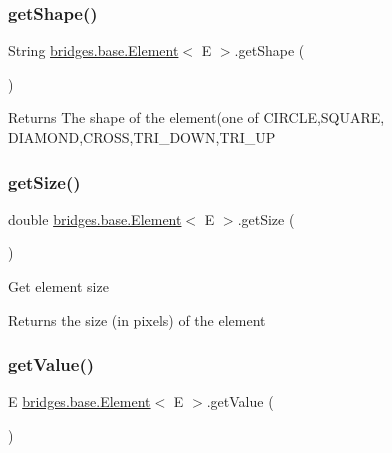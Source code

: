 \subsubsection{\texorpdfstring{getShape()}{getShape()}}
{\footnotesize\ttfamily String \mbox{\hyperlink{classbridges_1_1base_1_1_element}{bridges.\+base.\+Element}}$<$ E $>$.get\+Shape (\begin{DoxyParamCaption}{ }\end{DoxyParamCaption})}

\begin{DoxyReturn}{Returns}
The shape of the element(one of C\+I\+R\+C\+LE,S\+Q\+U\+A\+RE, D\+I\+A\+M\+O\+ND,C\+R\+O\+SS,T\+R\+I\+\_\+\+D\+O\+WN,T\+R\+I\+\_\+\+UP 
\end{DoxyReturn}
\mbox{\label{classbridges_1_1base_1_1_element_add4b836e041e45e0c7a80eb7fd5a229d}} 
\subsubsection{\texorpdfstring{getSize()}{getSize()}}
{\footnotesize\ttfamily double \mbox{\hyperlink{classbridges_1_1base_1_1_element}{bridges.\+base.\+Element}}$<$ E $>$.get\+Size (\begin{DoxyParamCaption}{ }\end{DoxyParamCaption})}

Get element size \begin{DoxyReturn}{Returns}
the size (in pixels) of the element 
\end{DoxyReturn}
\mbox{\label{classbridges_1_1base_1_1_element_a44ddc61db34b6cf0bab7dfba667d54af}} 
\subsubsection{\texorpdfstring{getValue()}{getValue()}}
{\footnotesize\ttfamily E \mbox{\hyperlink{classbridges_1_1base_1_1_element}{bridges.\+base.\+Element}}$<$ E $>$.get\+Value (\begin{DoxyParamCaption}{ }\end{DoxyParamCaption})}

